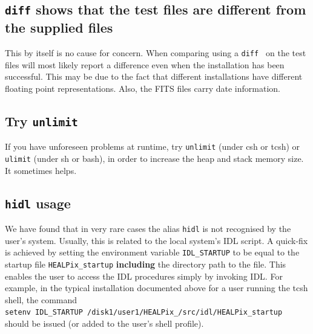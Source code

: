 \documentclass[12pt,twoside]{article}
\begin{document}

\subsection{\texttt{diff} shows that the test files are different from
the supplied files}

This by itself is no cause for concern. When comparing using a
\texttt{diff } on the test files will most likely report a
difference even when the installation has been successful. 
This  may be due to the fact that
different installations  have different floating point
representations. Also, the FITS files carry date information.



\subsection{Try \texttt{unlimit}}

If you have unforeseen problems at runtime, try \texttt{unlimit} (under csh or tcsh) or \texttt{ulimit} (under sh or bash), in order to increase the heap and stack memory size. It
sometimes helps.

\subsection{\texttt{hidl} usage}

We have found that in very rare cases the alias \texttt{hidl}
is not recognised by the user's system. Usually, this is related
to the local system's IDL script. A quick-fix is achieved
by setting the environment variable \texttt{IDL\_STARTUP} to be
equal to the \healpix startup file \texttt{HEALPix\_startup}
{\bf including} the directory path to the file. This enables
the user to access the \healpix IDL procedures simply by invoking
IDL. For example, in the typical installation documented
above for a user running the tcsh shell, the command \hfill \\
\texttt{setenv IDL\_STARTUP
/disk1/user1/HEALPix\_\hpxversion/src/idl/HEALPix\_startup}
\hfill \\
should be issued (or added to the user's shell profile).
\end{document}
